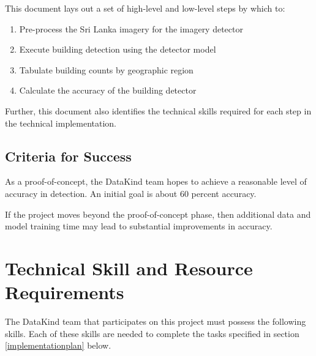\documentclass[12pt, a4paper, oneside, headinclude, footinclude]{article}
\begin{document}
This document lays out a set of high-level and low-level steps by which to:
\begin{enumerate}
  \item Pre-process the Sri Lanka imagery for the imagery detector
  \item Execute building detection using the detector model
  \item Tabulate building counts by geographic region
  \item Calculate the accuracy of the building detector
\end{enumerate}

Further, this document also identifies the technical skills required for each
step in the technical implementation. 

\subsection{Criteria for Success}
As a proof-of-concept, the DataKind team hopes to achieve a reasonable level of
accuracy in detection. An initial goal is about 60 percent accuracy.

If the project moves beyond the proof-of-concept phase, then additional data and model training time may lead to substantial improvements in accuracy.

\section{Technical Skill and Resource Requirements}


The DataKind team that participates on this project must possess the following
skills. Each of these skills are needed to complete the tasks specified in
section \ref{implementationplan} below.
\end{document}
